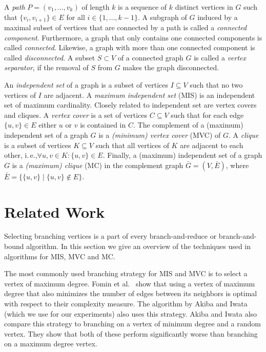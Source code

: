 \documentclass[a4paper,UKenglish,cleveref, autoref, thm-restate]{lipics-v2021}
\newcommand{\ie}{i.\,e.,\xspace}
\begin{document}
A \emph{path} $P=(v_1, \ldots, v_k)$ of length $k$ is a sequence of $k$ distinct vertices in $G$ such that $\{v_i, v_{i+1}\} \in E$ for all $i \in \{1, \ldots, k-1\}$.
A subgraph of $G$ induced by a maximal subset of vertices that are connected by a path is called a \emph{connected component}.
Furthermore, a graph that only contains one connected components is called \emph{connected}.
Likewise, a graph with more than one connected component is called \emph{disconnected}.
A subset $S \subset V$ of a connected graph $G$ is called a \emph{vertex separator}, if the removal of $S$ from $G$ makes the graph disconnected.

An \emph{independent set} of a graph is a subset of vertices $I \subseteq V$ such that no two vertices of $I$ are adjacent. 
A \emph{maximum independent set} (MIS) is an independent set of maximum cardinality.
Closely related to independent set are vertex covers and cliques.
A \emph{vertex cover} is a set of vertices $C \subseteq V$ such that for each edge $\{u,v\} \in E$ either $u$ or $v$ is contained in $C$.
The complement of a (maximum) independent set of a graph $G$ is a \emph{(minimum) vertex cover} (MVC) of $G$.
A \emph{clique} is a subset of vertices $K \subseteq V$ such that all vertices of $K$ are adjacent to each other, \ie $\forall u,v \in K: \{u,v\} \in E$.
Finally, a (maximum) independent set of a graph $G$ is a \emph{(maximum) clique} (MC) in the complement graph $\bar{G} = (V, \bar{E})$, where $\bar{E} = \{\{u,v\} \mid \{u,v\} \not\in E\}$.

\section{Related Work}
Selecting branching vertices is a part of every branch-and-reduce or
branch-and-bound algorithm. In this section we give an overview of the techniques used in
algorithms for MIS, MVC and MC.

The most commonly used branching strategy for MIS and MVC is to select a vertex
of maximum degree. Fomin et al.~\cite{Fomin} show that using a vertex of maximum
degree that also minimizes the number of edges between its neighbors is optimal
with respect to their complexity measure. The algorithm by Akiba and Iwata~\cite{AkibaIwata}
(which we use for our experiments) also uses this strategy. Akiba and Iwata also
compare this strategy to branching on a vertex of minimum degree and a random
vertex. They show that both of these perform significantly worse than branching
on a maximum degree vertex.
\end{document}

